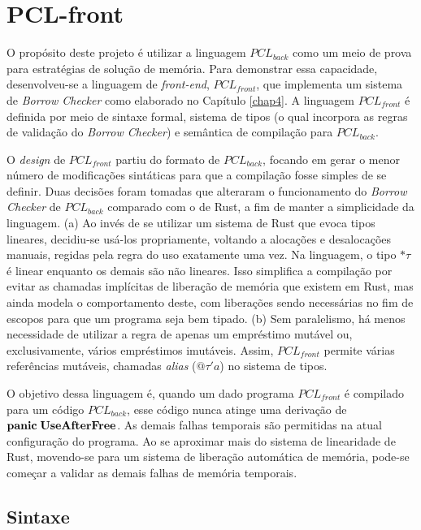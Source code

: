 \chapter{PCL-front}
\label{chap5}

O propósito deste projeto é utilizar a linguagem $PCL_{back}$ como um meio de prova para estratégias de solução de memória. Para demonstrar essa capacidade, desenvolveu-se a linguagem de \emph{front-end}, $PCL_{front}$, que implementa um sistema de \emph{Borrow Checker} como elaborado no Capítulo \ref{chap4}. A linguagem $PCL_{front}$ é definida por meio de sintaxe formal, sistema de tipos (o qual incorpora as regras de validação do \emph{Borrow Checker}) e semântica de compilação para $PCL_{back}$.

O \emph{design} de $PCL_{front}$ partiu do formato de $PCL_{back}$, focando em gerar o menor número de modificações sintáticas para que a compilação fosse simples de se definir. Duas decisões foram tomadas que alteraram o funcionamento do \emph{Borrow Checker} de $PCL_{back}$ comparado com o de Rust, a fim de manter a simplicidade da linguagem. (a) Ao invés de se utilizar um sistema de Rust que evoca tipos lineares, decidiu-se usá-los propriamente, voltando a alocações e desalocações manuais, regidas pela regra do uso exatamente uma vez. Na linguagem, o tipo $\text{*}\tau$ é linear enquanto os demais são não lineares. Isso simplifica a compilação por evitar as chamadas implícitas de liberação de memória que existem em Rust, mas ainda modela o comportamento deste, com liberações sendo necessárias no fim de escopos para que um programa seja bem tipado. (b) Sem paralelismo, há menos necessidade de utilizar a regra de apenas um empréstimo mutável ou, exclusivamente, vários empréstimos imutáveis. Assim, $PCL_{front}$ permite várias referências mutáveis, chamadas \emph{alias} ($@\tau'a$) no sistema de tipos. 

O objetivo dessa linguagem é, quando um dado programa $PCL_{front}$ é compilado para um código $PCL_{back}$, esse código nunca atinge uma derivação de $\mathbf{panic}\;\mathbf{UseAfterFree}$. As demais falhas temporais são permitidas na atual configuração do programa. Ao se aproximar mais do sistema de linearidade de Rust, movendo-se para um sistema de liberação automática de memória, pode-se começar a validar as demais falhas de memória temporais.

\section{Sintaxe}

